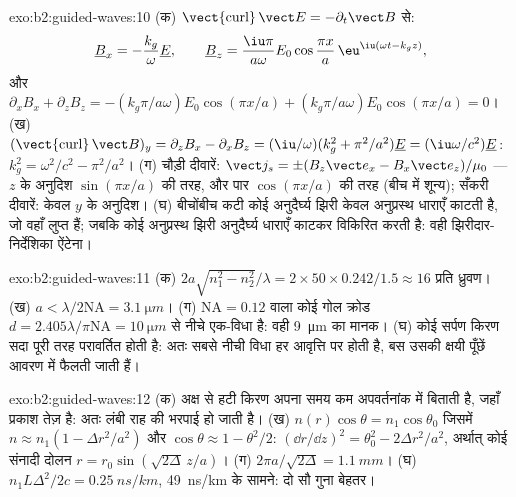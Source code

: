 \begin{solution}{exo:b2:guided-waves:10}
(क) $\operatorname{\vect{curl}}\vect E = -\partial_t\vect B$ से:
\[
\underline B_x = -\frac{k_g}\omega\underline E , \qquad
\underline B_z = \frac{\iu\pi}{a\omega}E_0\cos\frac{\pi x}a\,\eu^{\iu(\omega t - k_gz)} ,
\]
और $\partial_xB_x + \partial_zB_z = -(k_g\pi/a\omega)E_0\cos(\pi x/a) + (k_g\pi/a\omega)E_0
\cos(\pi x/a) = 0$। (ख) $(\operatorname{\vect{curl}}\vect B)_y = \partial_zB_x - \partial_xB_z =
(\iu/\omega)(k_g^2 + \pi^2/a^2)\underline E = (\iu\omega/c^2)\underline E$: $k_g^2 = \omega^2/c^2 - \pi^2/a^2$।
(ग) चौड़ी दीवारें: $\vect j_s = \pm(B_z\vect e_x - B_x\vect e_z)/\mu_0$ --- $z$ के अनुदिश
$\sin(\pi x/a)$ की तरह, और पार $\cos(\pi x/a)$ की तरह (बीच में शून्य); सँकरी
दीवारें: केवल $y$ के अनुदिश। (घ) बीचोंबीच कटी कोई अनुदैर्घ्य झिरी केवल
अनुप्रस्थ धाराएँ काटती है, जो वहाँ लुप्त हैं; जबकि कोई अनुप्रस्थ झिरी
अनुदैर्घ्य धाराएँ काटकर विकिरित करती है: वही झिरीदार-निर्देशिका ऐंटेना।
\end{solution}

\begin{solution}{exo:b2:guided-waves:11}
(क) $2a\sqrt{n_1^2 - n_2^2}/\lambda = 2 \times 50 \times 0.242/1.5 \approx 16$ प्रति ध्रुवण।
(ख) $a < \lambda/2\mathrm{NA} = \qty{3.1}{\micro m}$। (ग) $\mathrm{NA} =
0.12$ वाला कोई गोल क्रोड $d = 2.405\lambda/\pi\mathrm{NA} = \qty{10}{\micro m}$ से नीचे एक-विधा है:
वही \qty{9}{\micro m} का मानक। (घ) कोई सर्पण किरण सदा पूरी तरह परावर्तित होती है:
अतः सबसे नीची विधा हर आवृत्ति पर होती है, बस उसकी क्षयी पूँछें
आवरण में फैलती जाती हैं।
\end{solution}

\begin{solution}{exo:b2:guided-waves:12}
(क) अक्ष से हटी किरण अपना समय कम अपवर्तनांक में बिताती है, जहाँ प्रकाश
तेज़ है: अतः लंबी राह की भरपाई हो जाती है। (ख) $n(r)\cos\theta = n_1\cos\theta_0$
जिसमें $n \approx n_1(1 - \Delta r^2/a^2)$ और $\cos\theta \approx 1 - \theta^2/2$: $(\dd r/\dd z)^2 =
\theta_0^2 - 2\Delta r^2/a^2$, अर्थात् कोई संनादी दोलन $r = r_0\sin(\sqrt{2\Delta}\,z/a)$।
(ग) $2\pi a/\sqrt{2\Delta} = \qty{1.1}{mm}$। (घ) $n_1L\Delta^2/2c = \qty{0.25}{ns/km}$, \qty{49}{ns/km}
के सामने: दो सौ गुना बेहतर।
\end{solution}

